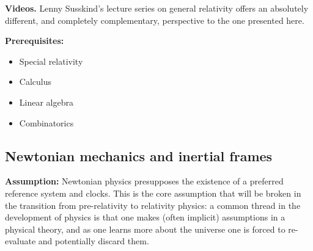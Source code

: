 \begin{center}
\end{center}

\noindent\textbf{Videos.} Lenny Susskind's lecture series on general
relativity offers an absolutely different, and completely
complementary, perspective to the one presented here.

\medskip\noindent\textbf{Prerequisites:}
\begin{itemize}
  \item Special relativity
  \item Calculus
  \item Linear algebra
  \item Combinatorics
\end{itemize}

\subsection{Newtonian mechanics and inertial frames}

\textbf{Assumption:} Newtonian physics presupposes the existence of a
preferred reference system and clocks.  This is the core assumption
that will be broken in the transition from pre-relativity to
relativity physics: a common thread in the development of physics is
that one makes (often implicit) assumptions in a physical theory, and
as one learns more about the universe one is forced to re-evaluate and
potentially discard them.

